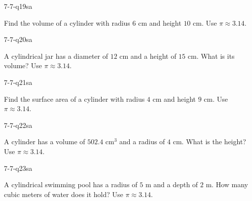 
\begin{practiceQuestion}{7-7-q19}{sa}
\begin{questionText}
Find the volume of a cylinder with radius $6$ cm and height $10$ cm. Use $\pi \approx 3.14$.
\end{questionText}
\end{practiceQuestion}

\begin{practiceQuestion}{7-7-q20}{sa}
\begin{questionText}
A cylindrical jar has a diameter of $12$ cm and a height of $15$ cm. What is its volume? Use $\pi \approx 3.14$.
\end{questionText}
\end{practiceQuestion}

\begin{practiceQuestion}{7-7-q21}{sa}
\begin{questionText}
Find the surface area of a cylinder with radius $4$ cm and height $9$ cm. Use $\pi \approx 3.14$.
\end{questionText}
\end{practiceQuestion}

\begin{practiceQuestion}{7-7-q22}{sa}
\begin{questionText}
A cylinder has a volume of $502.4$ cm$^3$ and a radius of $4$ cm. What is the height? Use $\pi \approx 3.14$.
\end{questionText}
\end{practiceQuestion}

\begin{practiceQuestion}{7-7-q23}{sa}
\begin{questionText}
A cylindrical swimming pool has a radius of $5$ m and a depth of $2$ m. How many cubic meters of water does it hold? Use $\pi \approx 3.14$.
\end{questionText}
\end{practiceQuestion}

